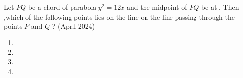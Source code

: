 \item Let $PQ$ be a chord of parabola $y^2=12x$ and the midpoint of $PQ$ be at  . Then ,which of the following points lies on the line on the line passing through the points $P$ and $Q$ ?
\hfill{(April-2024)}
\begin{multicols}{2}
\begin{enumerate}
\item {}
\item {}
\item {}
\item {}
\end{enumerate}
\end{multicols}
